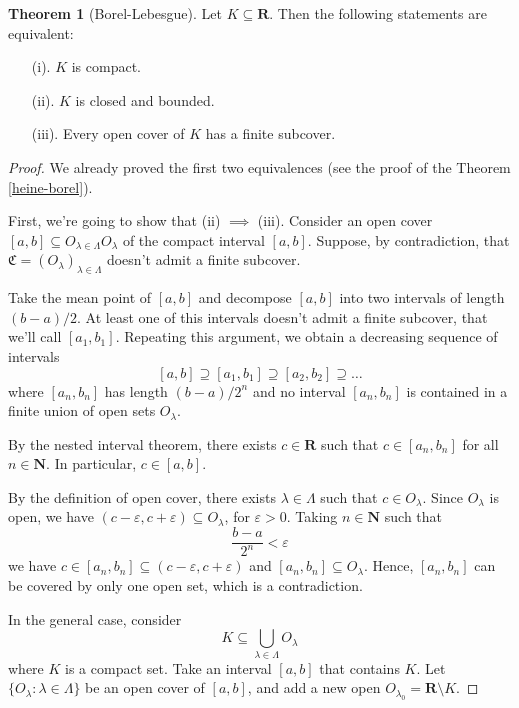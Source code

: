 \documentclass[12pt,a4paper]{article}
\theoremstyle{definition}
\newtheorem{theorem}{Theorem}[section]
\begin{document}
\begin{theorem}[Borel-Lebesgue]
	Let $K \subseteq \textbf{R}$. Then the following statements are equivalent:
	\begin{itemize}
		\item[(i).] $K$ is compact.
		\item[(ii).] $K$ is closed and bounded.
		\item[(iii).] Every open cover of $K$ has a finite subcover.
	\end{itemize}
\end{theorem}

\begin{proof}
	We already proved the first two equivalences (see the proof of the Theorem \ref{heine-borel}). 
	
	First, we're going to show that (ii) $\implies$ (iii). Consider an open cover $[a,b] \subseteq O_{\lambda \in \Lambda} O_\lambda$ of the compact interval $[a,b]$. Suppose, by contradiction, that $\mathfrak{C} = (O_\lambda)_{\lambda \in \Lambda}$ doesn't admit a finite subcover.
	
	Take the mean point of $[a,b]$ and decompose $[a,b]$ into two intervals of length $(b-a)/2$. At least one of this intervals doesn't admit a finite subcover, that we'll call $[a_1, b_1]$. Repeating this argument, we obtain a decreasing sequence of intervals
	\[
		[a,b] \supseteq [a_1, b_1] \supseteq [a_2, b_2] \supseteq \ldots
	\]
	where $[a_n, b_n]$ has length $(b-a)/2^n$ and no interval $[a_n, b_n]$ is contained in a finite union of open sets $O_\lambda$.
	
	By the nested interval theorem, there exists $c \in \textbf{R}$ such that $c \in [a_n, b_n]$ for all $n \in \textbf{N}$. In particular, $c \in [a,b]$.
	
	By the definition of open cover, there exists $\lambda \in \Lambda$ such that $c \in O_\lambda$. Since $O_\lambda$ is open, we have $(c-\varepsilon, c+\varepsilon) \subseteq O_\lambda$, for $\varepsilon > 0$. Taking $n \in \textbf{N}$ such that
	\[
		\frac{b-a}{2^n} < \varepsilon
	\]
	we have $c \in [a_n, b_n] \subseteq (c-\varepsilon, c+\varepsilon)$ and $[a_n, b_n] \subseteq O_\lambda$. Hence, $[a_n, b_n]$ can be covered by only one open set, which is a contradiction. 
	
	In the general case, consider
	\[
		K \subseteq \bigcup_{\lambda \in \Lambda} O_\lambda
	\]
	where $K$ is a compact set. Take an interval $[a,b]$ that contains $K$. Let $\{ O_\lambda : \lambda \in \Lambda \}$ be an open cover of $[a,b]$, and add a new open $O_{\lambda_0} = \textbf{R} \setminus K$.
	

\end{proof}
\end{document}
